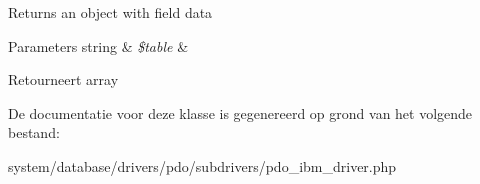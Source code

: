 Returns an object with field data


\begin{DoxyParams}[1]{Parameters}
string & {\em \$table} & \\
\hline
\end{DoxyParams}
\begin{DoxyReturn}{Retourneert}
array 
\end{DoxyReturn}


De documentatie voor deze klasse is gegenereerd op grond van het volgende bestand\+:\begin{DoxyCompactItemize}
\item 
system/database/drivers/pdo/subdrivers/pdo\+\_\+ibm\+\_\+driver.\+php\end{DoxyCompactItemize}
